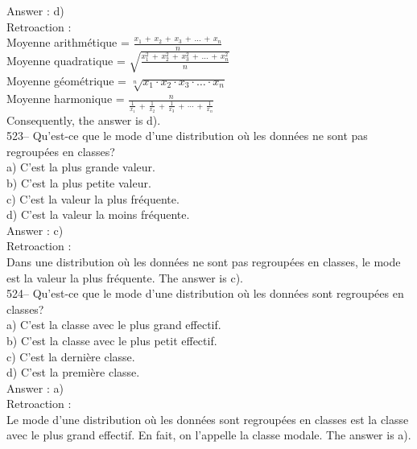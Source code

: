 ﻿\documentclass[letterpaper, 12pt]{article}
\begin{document}
Answer : d)\\

Retroaction : \\
Moyenne arithm\'etique =
$\frac{x_1\,+\,x_2\,+\,x_3\,+\,\ldots\,+\,x_n}{n}$\\[2mm]
Moyenne quadratique =
$\sqrt{\frac{x_1^{2}\,+\,x_2^{2}\,+\,x_3^{2}\,+\,\ldots\,+\,x_n^{2}}{n}}$\\[2mm]
Moyenne g\'eom\'etrique = $\sqrt[n]{x_1\cdot x_2\cdot x_3 \cdot \ldots \cdot
x_n}$\\[2mm]
Moyenne harmonique =
$\frac{n}{\frac{1}{x_1}\,+\,\frac{1}{x_2}\,+\,\frac{1}{x_3}\,+\,\cdots\,+\,\frac{1}{x_n}}$\\[2mm]
Consequently, the answer is d).\\

523-- Qu'est-ce que le mode d'une distribution o\`u les donn\'ees ne sont
pas regroup\'ees en classes?\\
a) C'est la plus grande valeur.\\
b) C'est la plus petite valeur.\\
c) C'est la valeur la plus fr\'equente.\\
d) C'est la valeur la moins fr\'equente.\\

Answer : c)\\

Retroaction : \\
Dans une distribution o\`u les donn\'ees ne sont pas regroup\'ees en
classes, le mode est la valeur la plus fr\'equente.  The answer is c).\\

524-- Qu'est-ce que le mode d'une distribution o\`u les donn\'ees sont
regroup\'ees en classes?\\
a) C'est la classe avec le plus grand effectif.\\
b) C'est la classe avec le plus petit effectif.\\
c) C'est la derni\`ere classe.\\
d) C'est la premi\`ere classe.\\

Answer : a)\\

Retroaction : \\
Le mode d'une distribution o\`u les donn\'ees sont regroup\'ees en classes
est la classe avec le plus grand effectif.  En fait, on l'appelle la classe
modale.  The answer is a).\\
\end{document}
